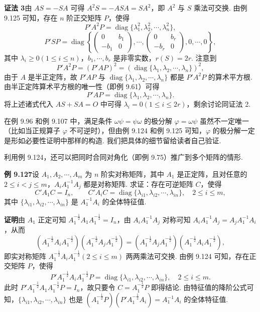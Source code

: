 \documentclass[UTF8,12pt,a4paper,fontset=fandol]{ctexart}
\begin{document}
\noindent\textbf{证法 3}\quad 由 $AS=-SA$ 可得 $A^2S=-ASA=SA^2$，即 $A^2$ 与 $S$ 乘法可交换. 由例 9.125 可知，存在 $n$ 阶正交矩阵 $P$，使得
\[
P'A^2P=\operatorname{diag}\{\lambda_1^2,\lambda_2^2,\cdots,\lambda_n^2\},
\]
\[
P'SP=\operatorname{diag}\left\{
\begin{pmatrix}
0&b_1\\
-b_1&0
\end{pmatrix},\cdots,
\begin{pmatrix}
0&b_r\\
-b_r&0
\end{pmatrix},
0,\cdots,0
\right\},
\]
其中 $\lambda_i\ge0(1\le i\le n)$，$b_1,\cdots,b_r$ 是非零实数，$r(S)=2r$. 注意到
\[
P'A^2P=(P'AP)^2=(\operatorname{diag}\{\lambda_1,\lambda_2,\cdots,\lambda_n\})^2,
\]
由于 $A$ 是半正定阵，故 $P'AP$ 与 $\operatorname{diag}\{\lambda_1,\lambda_2,\cdots,\lambda_n\}$ 都是 $P'A^2P$ 的算术平方根. 由半正定阵算术平方根的唯一性（即例 9.61）可得
\[
P'AP=\operatorname{diag}\{\lambda_1,\lambda_2,\cdots,\lambda_n\}.
\]
将上述诸式代入 $AS+SA=O$ 中可得 $\lambda_i=0(1\le i\le2r)$，剩余讨论同证法 2.

在例 9.96 和例 9.107 中，满足条件 $\omega\psi=\psi\omega$ 的极分解 $\varphi=\omega\psi$ 虽然不一定唯一（比如当正规算子 $\varphi$ 不可逆时），但由例 9.124 和例 9.125 可知，$\varphi$ 的极分解一定是形如必要性证明中那样的构造. 我们把具体的细节留给读者自己验证.

利用例 9.124，还可以把同时合同对角化（即例 9.75）推广到多个矩阵的情形.

\noindent\textbf{例 9.127}\quad 设 $A_1,A_2,\cdots,A_m$ 为 $n$ 阶实对称矩阵，其中 $A_1$ 是正定阵，且对任意的 $2\le i<j\le m$，$A_iA_1^{-1}A_j$ 都是对称矩阵. 求证：存在可逆矩阵 $C$，使得
\[
C'A_1C=I_n,\qquad C'A_iC=\operatorname{diag}\{\lambda_{i1},\lambda_{i2},\cdots,\lambda_{in}\},\quad 2\le i\le m,
\]
其中 $\{\lambda_{i1},\lambda_{i2},\cdots,\lambda_{in}\}$ 是 $A_1^{-1}A_i$ 的全体特征值.

\noindent\textbf{证明}\quad 由 $A_1$ 正定可知 $A_1^{-\frac12}A_1A_1^{-\frac12}=I_n$，由 $A_iA_1^{-1}A_j$ 对称可知 $A_iA_1^{-1}A_j=A_jA_1^{-1}A_i$，从而
\[
(A_1^{-\frac12}A_iA_1^{-\frac12})(A_1^{-\frac12}A_jA_1^{-\frac12})
=(A_1^{-\frac12}A_jA_1^{-\frac12})(A_1^{-\frac12}A_iA_1^{-\frac12}),
\]
即实对称矩阵 $A_1^{-\frac12}A_iA_1^{-\frac12}(2\le i\le m)$ 两两乘法可交换. 由例 9.124 可知，存在正交矩阵 $P$，使得
\[
P'A_1^{-\frac12}A_iA_1^{-\frac12}P=\operatorname{diag}\{\lambda_{i1},\lambda_{i2},\cdots,\lambda_{in}\},\quad 2\le i\le m.
\]
此时 $P'A_1^{-\frac12}A_1A_1^{-\frac12}P=I_n$，故只要令 $C=A_1^{-\frac12}P$ 即得结论. 由特征值的降阶公式可知，$\{\lambda_{i1},\lambda_{i2},\cdots,\lambda_{in}\}$ 也是 $(A_1^{-\frac12}P)(P'A_1^{-\frac12}A_i)=A_1^{-1}A_i$ 的全体特征值.
\end{document}
